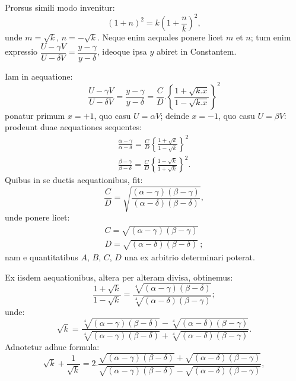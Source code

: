 \documentclass{article}
\begin{document}

Prorsus simili modo invenitur:
\[
(1+n)^{2}=k\left(1+\frac{n}{k}\right)^{2},
\]
unde $m=\sqrt{k}$, $n=-\sqrt{k}$. Neque enim aequales ponere licet $m$ et $n$; tum enim expressio $\dfrac{U-\gamma V}{U-\delta V}=\dfrac{y-\gamma}{y-\delta}$, ideoque ipsa $y$ abiret in Constantem.

Iam in aequatione:
\[
\frac{U-\gamma V}{U-\delta V}=\frac{y-\gamma}{y-\delta}=\frac{C}{D}.\left\{\frac{1+\sqrt{k.x}}{1-\sqrt{k.x}}\right\}^{2}
\]
ponatur primum $x=+1$, quo casu $U=\alpha V$; deinde $x=-1$, quo casu $U=\beta V$: prodeunt duae aequationes sequentes:
\[
\begin{gathered}
\frac{\alpha-\gamma}{\alpha-\delta}=\frac{C}{D}\left\{\frac{1+\sqrt{k}}{1-\sqrt{k}}\right\}^{2}\\
\frac{\beta-\gamma}{\beta-\delta}=\frac{C}{D}\left\{\frac{1-\sqrt{k}}{1+\sqrt{k}}\right\}^{2}.
\end{gathered}
\]
Quibus in se ductis aequationibus, fit:
\[
\frac{C}{D}=\sqrt{\frac{(\alpha-\gamma)(\beta-\gamma)}{(\alpha-\delta)(\beta-\delta)}},
\]
unde ponere licet:
\[
\begin{gathered}
C=\sqrt{(\alpha-\gamma)(\beta-\gamma)}\\
D=\sqrt{(\alpha-\delta)(\beta-\delta)}\ ;
\end{gathered}
\]
nam e quantitatibus $A$, $B$, $C$, $D$ una ex arbitrio determinari poterat.

Ex iisdem aequationibus, altera per alteram divisa, obtinemus:
\[
\frac{1+\sqrt{k}}{1-\sqrt{k}}=\frac{\sqrt[4]{(\alpha-\gamma)(\beta-\delta)}}{\sqrt[4]{(\alpha-\delta)(\beta-\gamma)}};
\]
unde:
\[
\sqrt{k}=\frac{\sqrt[4]{(\alpha-\gamma)(\beta-\delta)}-\sqrt[4]{(\alpha-\delta)(\beta-\gamma)}}{\sqrt[4]{(\alpha-\gamma)(\beta-\delta)}+\sqrt[4]{(\alpha-\delta)(\beta-\gamma)}}.
\]
Adnotetur adhuc formula:
\[
\sqrt{k}+\frac{1}{\sqrt{k}}=2.\frac{\sqrt{(\alpha-\gamma)(\beta-\delta)}+\sqrt{(\alpha-\delta)(\beta-\gamma)}}{\sqrt{(\alpha-\gamma)(\beta-\delta)}-\sqrt{(\alpha-\delta)(\beta-\gamma)}},
\]

\end{document}
